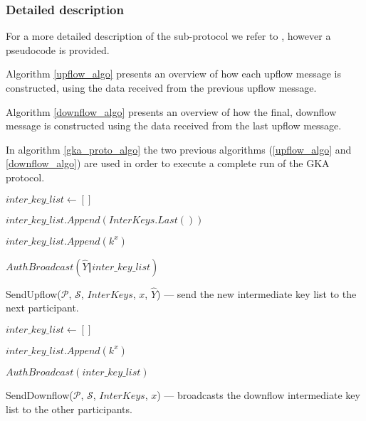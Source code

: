 \subsubsection{Detailed description}
For a more detailed description of the sub-protocol we refer to \cite{mpenc}, however a pseudocode is provided.

Algorithm \ref{upflow_algo} presents an overview of how each upflow message is constructed, using the data received from the previous upflow message.

Algorithm \ref{downflow_algo} presents an overview of how the final, downflow message is constructed using the data received from the last upflow message.

In algorithm \ref{gka_proto_algo} the two previous algorithms (\ref{upflow_algo} and \ref{downflow_algo}) are used in order to execute a complete run of the GKA protocol.
\vfill
\begin{algorithm}[H]
  \Begin
  {
    $inter\_key\_list \leftarrow []$

    $inter\_key\_list.Append(InterKeys.Last() )$

    {
      $inter\_key\_list.Append(k^x)$
    }

    $AuthBroadcast(\hat{Y} \Vert inter\_key\_list)$
  }
  \caption{SendUpflow($\mathcal{P}$, $\mathcal{S}$, $InterKeys$, $x$, $\hat{Y}$) --- send the new intermediate key list to the next participant.}
  \label{upflow_algo}
\end{algorithm}
\vfill
\begin{algorithm}[H]
  \Begin
  {
    $inter\_key\_list \leftarrow []$

    {
      $inter\_key\_list.Append(k^x)$
	}

    $AuthBroadcast(inter\_key\_list)$
  }
  \caption{SendDownflow($\mathcal{P}$, $\mathcal{S}$, $InterKeys$, $x$) --- broadcasts the downflow intermediate key list to the other participants.}
  \label{downflow_algo}
\end{algorithm}
